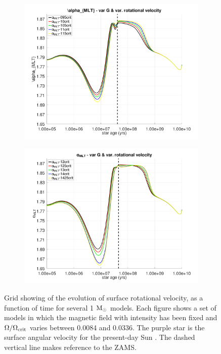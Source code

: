 \documentclass[fleqn,usenatbib]{mnras}
\begin{document}
\begin{figure}
    \centering
    \begin{subfigure}[h]{0.47\textwidth}
    \includegraphics[clip,width=\textwidth]{figures/paper2/alpha_mlt_var_vel_g1.pdf}
    \label{fig:subim41}
    \end{subfigure}
    \begin{subfigure}[h]{0.47\textwidth}
    \includegraphics[clip,width=\textwidth]{figures/paper2/alpha_mlt_var_vel_g3.pdf}
    \label{fig:subim42}
    \end{subfigure}
\caption{Grid showing of the evolution of surface rotational velocity, as a function of time for several 1 $\mathrm{M}_\odot$ models. Each figure shows a set of models in which the magnetic field with intensity has been fixed and $\Omega / \Omega_{\mathrm{crit}}$ varies between 0.0084 and 0.0336. The purple star is the surface angular velocity for the present-day Sun \citep{Gill2012}. The dashed vertical line makes reference to the ZAMS.}
\label{fig:grid_rot_vel}
\end{figure}

\appendix



\bsp	%
\label{lastpage}
\end{document}
